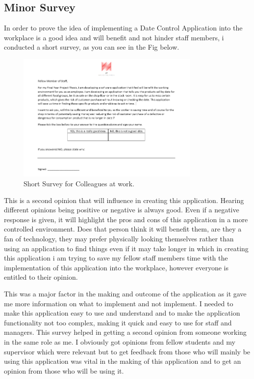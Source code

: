 \subsection{Minor Survey}
In order to prove the idea of implementing a Date Control Application into the workplace is a good idea and will benefit and not hinder staff members, i conducted a short survey, as you can see in the Fig below.

\begin{figure}[h!]
	\caption{Short Survey for Colleagues at work.}
	\label{image:survey}
	\centering
	\includegraphics[width=0.8\textwidth]{images/AF-Date-Control-Survey.PNG}
\end{figure}

This is a second opinion that will influence in creating this application. Hearing different opinions being positive or negative is always good. Even if a negative response is given, it will highlight the pros and cons of this application in a more controlled environment. Does that person think it will benefit them, are they a fan of technology, they may prefer physically looking themselves rather than using an application to find things even if it may take longer in which in creating this application i am trying to save my fellow staff members time with the implementation of this application into the workplace, however everyone is entitled to their opinion. 
\newline

This was a major factor in the making and outcome of the application as it gave me more information on what to implement and not implement. I needed to make this application easy to use and understand and to make the application functionality not too complex, making it quick and easy to use for staff and managers. This survey helped in getting a second opinion from someone working in the same role as me. I obviously got opinions from fellow students and my supervisor which were relevant but to get feedback from those who will mainly be using this application was vital in the making of this application and to get an opinion from those who will be using it.
\newline

